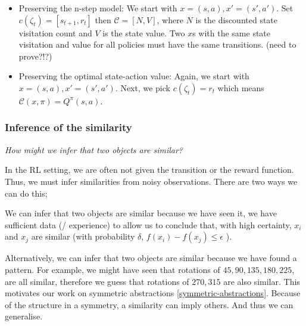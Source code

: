 \begin{itemize}
  \tightlist
  \item Preserving the n-step model: We start with $x=(s, a), x'=(s', a')$. Set $c(\zeta_{t}) = [s_{t+1}, r_{t}]$ then $\mathcal C=[N, V]$, where $N$ is the discounted state visitation count \footnotemark[27] and $V$ is the state value. Two $x$s with the same state visitation and value for all policies must have the same transitions. {\color{red}(need to prove?!?)}
  \item Preserving the optimal state-action value: Again, we start with $x=(s, a), x'=(s', a')$. Next, we pick $c(\zeta_{t}) = r_{t}$ which means $\mathcal C(x, \pi) = Q^{\pi}(s, a)$.
\end{itemize}


\subsubsection{Inference of the similarity}

\begin{displayquote}
	\textit{How might we infer that two objects are similar?}
\end{displayquote}


In the RL setting, we are often not given the transition or the reward function.
Thus, we must infer similarities from noisy observations. There are two ways we can do this;

\hspace{\parindent}We can infer that two objects are similar because we have seen it,
we have sufficient data (/ experience) to allow us to conclude that, with high
certainty, $x_i$ and $x_j$ are similar (with probability $\delta$, $f(x_i) - f(x_j) \le \epsilon$ ).

\hspace{\parindent}Alternatively, we can infer that two objects are similar because we have found a pattern.
For example, we might have seen that rotations of $45, 90, 135$$, 180, 225$, are all similar,
therefore we guess that rotations of $270, 315$ are also similar.
This motivates our work on symmetric abstractions \ref{symmetric-abstractions}.
Because of the structure in a symmetry, a similarity can imply others. And thus we can generalise.

